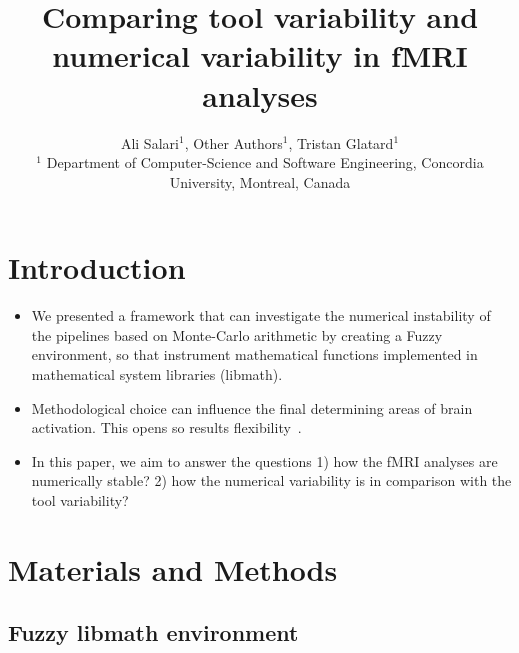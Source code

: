 \documentclass[conference]{IEEEtran}
\begin{document}
\newcommand{\fslspm}{FSL-SPM\xspace}
\newcommand{\fslafni}{FSL-AFNI\xspace}
\newcommand{\afnispm}{AFNI-SPM\xspace}


\title{Comparing tool variability and numerical variability in fMRI analyses}

\author{Ali Salari$^1$, Other Authors$^1$, Tristan Glatard$^1$ \\ 
$^1$ Department of Computer-Science and Software Engineering, Concordia University, Montreal, Canada}

\maketitle
\begin{abstract}
  
\end{abstract}

\begin{IEEEkeywords}
\end{IEEEkeywords}


\section{Introduction}

\begin{itemize}
    \item We presented a framework that can investigate the numerical instability of the pipelines based on Monte-Carlo arithmetic
    by creating a Fuzzy environment, so that instrument mathematical functions implemented in mathematical system libraries (libmath). 

    \item Methodological choice can influence the final determining areas of brain activation.
    This opens so results flexibility~\cite{bowring2019exploring,bowring2021isolating}. 
  
    \item In this paper, we aim to answer the questions 1) how the fMRI analyses are numerically stable?
    2) how the numerical variability is in comparison with the tool variability?
\end{itemize}

\section{Materials and Methods}

\subsection{Fuzzy libmath environment}
\end{document}
